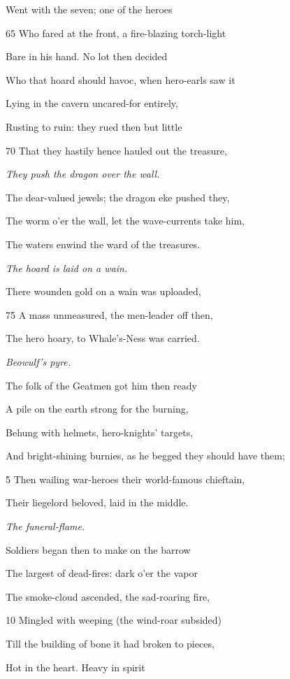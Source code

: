 Went with the seven; one of the heroes

65
Who fared at the front, a fire-blazing torch-light

Bare in his hand. No lot then decided

Who that hoard should havoc, when hero-earls saw it

Lying in the cavern uncared-for entirely,

Rusting to ruin: they rued then but little

70
That they hastily hence hauled out the treasure,

\emph{They push the
dragon over the
wall.}

The dear-valued jewels; the dragon eke pushed they,

The worm o’er the wall, let the wave-currents take him,

The waters enwind the ward of the treasures.

\emph{The hoard is laid
on a wain.}

There wounden gold on a wain was uploaded,

75
A mass unmeasured, the men-leader off then,

The hero hoary, to Whale’s-Ness was carried.



\emph{Beowulf’s pyre.}

The folk of the Geatmen got him then ready

A pile on the earth strong for the burning,

Behung with helmets, hero-knights’ targets,

And bright-shining burnies, as he begged they should have them;

5
Then wailing war-heroes their world-famous chieftain,

Their liegelord beloved, laid in the middle.

\emph{The funeral-flame.}

Soldiers began then to make on the barrow

The largest of dead-fires: dark o’er the vapor

The smoke-cloud ascended, the sad-roaring fire,

10
Mingled with weeping (the wind-roar subsided)

Till the building of bone it had broken to pieces,

Hot in the heart. Heavy in spirit

